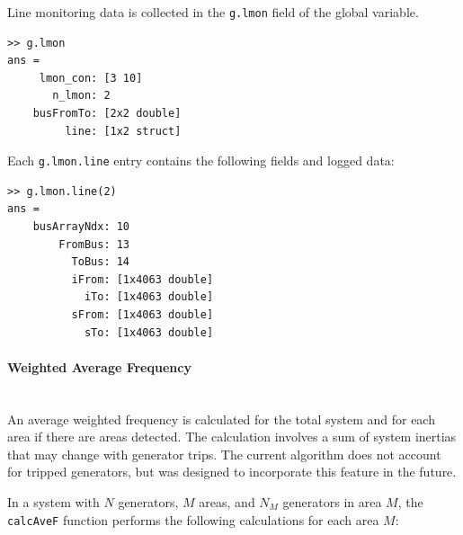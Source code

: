 \documentclass[12pt]{article}
\begin{document}
Line monitoring data is collected in the \verb|g.lmon| field of the global variable.

\begin{verbatim}
>> g.lmon
ans = 
     lmon_con: [3 10]
       n_lmon: 2
    busFromTo: [2x2 double]
         line: [1x2 struct]
\end{verbatim}

Each \verb|g.lmon.line| entry contains the following fields and logged data:

\begin{verbatim}
>> g.lmon.line(2)
ans = 
    busArrayNdx: 10
        FromBus: 13
          ToBus: 14
          iFrom: [1x4063 double]
            iTo: [1x4063 double]
          sFrom: [1x4063 double]
            sTo: [1x4063 double]
\end{verbatim}



\pagebreak
\paragraph{Weighted Average Frequency} \ \\
An average weighted frequency is calculated for the total system and for each area if there are areas detected.
The calculation involves a sum of system inertias that may change with generator trips.
The current algorithm does not account for tripped generators, but was designed to incorporate this feature in the future.

\vspace{1em}
In a system with $N$ generators, $M$ areas, and $N_M$ generators in area $M$, the \verb|calcAveF| function performs the following calculations for each area $M$:
\end{document}

